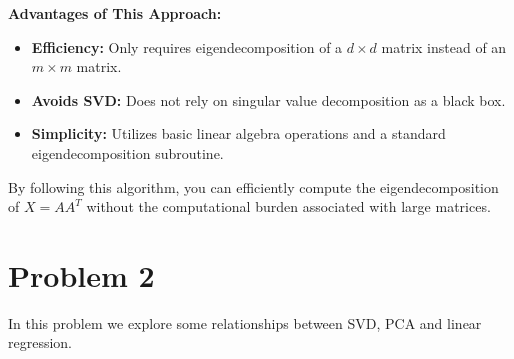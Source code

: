 \documentclass{article}
\begin{document}
\textbf{Advantages of This Approach:}
\begin{itemize}
    \item \textbf{Efficiency:} Only requires eigendecomposition of a $d \times d$ matrix instead of an $m \times m$ matrix.
    \item \textbf{Avoids SVD:} Does not rely on singular value decomposition as a black box.
    \item \textbf{Simplicity:} Utilizes basic linear algebra operations and a standard eigendecomposition subroutine.
\end{itemize}

By following this algorithm, you can efficiently compute the eigendecomposition of $X = AA^T$ without the computational burden associated with large matrices.

\section*{Problem 2}

In this problem we explore some relationships between SVD, PCA and linear regression.
\end{document}
